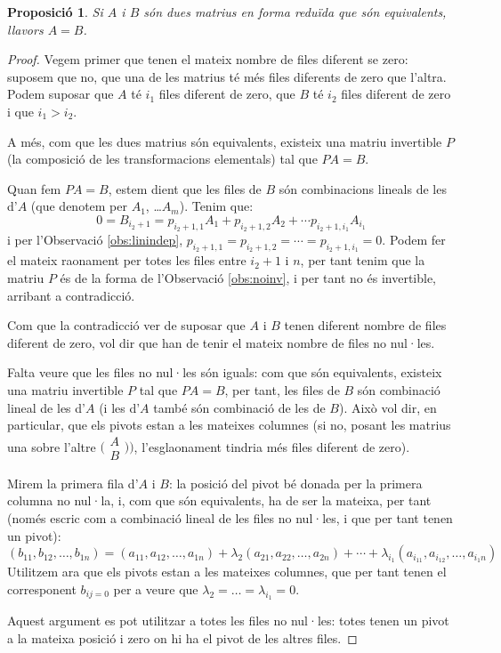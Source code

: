 \documentclass[a4paper,12pt,twoside]{article}
\newcommand{\1}{\mathbf{1}}
\newcommand{\0}{\mathbf{0}}
\newtheorem{proposicio}[teorema]{Proposició}
\theoremstyle{definition}
\theoremstyle{remark}
\begin{document}
\begin{proposicio}
	Si $A$ i $B$ són dues matrius en forma reduïda que són equivalents, llavors $A=B$. %
\end{proposicio}
\begin{proof}
	Vegem primer que tenen el mateix nombre de files diferent se zero: suposem que no, que una de les matrius té més files diferents de zero que l'altra. Podem suposar que $A$ té $i_1$ files diferent de zero, que $B$ té $i_2$ files diferent de zero i que $i_1>i_2$.

A més, com que les dues matrius són equivalents, existeix una matriu invertible $P$ (la composició de les transformacions elementals) tal que $PA=B$.

Quan fem $PA=B$, estem dient que les files de $B$ són combinacions lineals de les d'$A$ (que denotem per $A_1$, \dots $A_m$). Tenim que:
$$
0=B_{i_2+1}=p_{i_2+1,1}A_1+p_{i_2+1,2}A_2 + \cdots p_{i_2+1,i_1}A_{i_1}
$$
i per l'Observació \ref{obs:linindep}, $p_{i_2+1,1}=p_{i_2+1,2}=\cdots=p_{i_2+1,i_1}=0$. Podem fer el mateix raonament per totes les files entre $i_2+1$ i $n$, per tant tenim que la matriu $P$ és de la forma de l'Observació \ref{obs:noinv}, i per tant no és invertible, arribant a contradicció.

Com que la contradicció ver de suposar que $A$ i $B$ tenen diferent nombre de files diferent de zero, vol dir que han de tenir el mateix nombre de files no nul·les.

Falta veure que les files no nul·les són iguals: com que són equivalents, existeix una matriu invertible $P$ tal que $PA=B$, per tant, les files de $B$ són combinació lineal de les d'$A$ (i les d'$A$ també són combinació de les de $B$). Això vol dir, en particular, que els pivots estan a les mateixes columnes (si no, posant les matrius una sobre l'altre $\big(\begin{smallmatrix}A \\ B \end{smallmatrix})\big)$, l'esglaonament tindria més files diferent de zero).

Mirem la primera fila d'$A$ i $B$: la posició del pivot bé donada per la primera columna no nul·la, i, com que són equivalents, ha de ser la mateixa, per tant (només escric com a combinació lineal de les files no nul·les, i que per tant tenen un pivot):
$$
(b_{11},b_{12},\dots,b_{1n})=(a_{11},a_{12},\dots,a_{1n})+\lambda_2(a_{21},a_{22},\dots, a_{2n})+\cdots+\lambda_{i_1}(a_{i_11},a_{i_12},\dots,a_{i_1n})
$$
Utilitzem ara que els pivots estan a les mateixes columnes, que per tant tenen el corresponent $b_{ij=0}$ per a veure que $\lambda_2=\dots=\lambda_{i_1}=0$.

Aquest argument es pot utilitzar a totes les files no nul·les: totes tenen un pivot a la mateixa posició i zero on hi ha el pivot de les altres files.
\end{proof}
\end{document}
